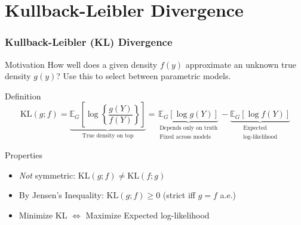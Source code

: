 \section{Kullback-Leibler Divergence}
\begin{frame}
  \frametitle{Kullback-Leibler (KL) Divergence}

  \begin{block}{Motivation}
    How well does a given density $f(y)$ approximate an unknown true density $g(y)$? Use this to select between parametric models.
  \end{block}

  \pause

  \begin{alertblock}{Definition}
    \vspace{-3em}
  \[
    \text{KL}(g;f) = \underbrace{\mathbb{E}_G \left[ \log\left\{ \frac{g(Y)}{f(Y)} \right\}\right]}_{\text{True density on top}} 
    = \underbrace{\mathbb{E}_G\left[ \log g(Y) \right]}_{\substack{\text{Depends only on truth} \\ \text{Fixed across models}}} - \underbrace{\mathbb{E}_G \left[ \log f(Y) \right]}_{\substack{\text{Expected} \\ \text{log-likelihood}}}
  \]
\end{alertblock}

\vspace{-2.5em}

\pause

\begin{block}{Properties}
  \begin{itemize}
    \item \emph{Not} symmetric: $\text{KL}(g;f) \neq \text{KL}(f;g)$
    \item By Jensen's Inequality: $\text{KL}(g;f) \geq 0$ (strict iff $g=f$ a.e.)
    \item Minimize KL $\iff$ Maximize Expected log-likelihood
  \end{itemize}

\end{block}

\end{frame}
